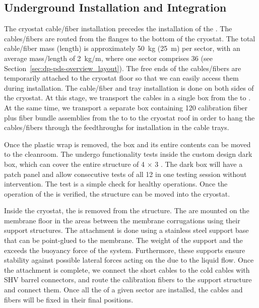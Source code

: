 \subsection{Underground Installation and Integration}
\label{subsec:dp-pds-undergroundinstallation}

The cryostat cable/fiber installation precedes the installation of the . The cables/fibers are routed from the flanges to the bottom of the cryostat. The total cable/fiber mass (length) is approximately \SI{50}{\kg} (\SI{25}{\m}) per sector, with an average mass/length of \SI{2}{\kg/\m}, where one sector comprises \num{36}  (see Section~\ref{sec:dp-pds-overview_layout}). The free ends of the cables/fibers are temporarily attached to the cryostat floor so that we can easily access them during installation. The cable/fiber and tray installation is done on both sides of the cryostat. At this stage, we transport the  cables %
in a single box from the  to . At the same time, we transport a separate box containing \num{120} calibration fiber plus fiber bundle assemblies %
 from the  to %
 to the cryostat roof in order to hang the cables/fibers %
 through the feedthroughs for installation in the cable trays.  

Once the plastic wrap is removed, the   box and its entire contents can be moved to the cleanroom. The  undergo functionality tests inside the custom design dark box, which can cover the entire structure of \num{4} $\times$ \num{3} . The dark box will have a  patch panel and allow consecutive tests of all \num{12}  in one testing session without intervention. The test is a simple check for healthy  operations. Once the operation of the  is verified, the structure can be moved into the cryostat.

Inside the cryostat, the  is removed from the structure. %
The  are mounted on the membrane floor in the areas between the membrane corrugations using their support structures. The attachment is done using a stainless steel support base that can be point-glued to the membrane. The weight of the support and the  exceeds the buoyancy force of the system. Furthermore, these supports %
ensure stability against possible lateral forces acting on the  due to the liquid flow. Once the attachment is complete, we connect the short  cables to the cold  cables with SHV barrel connectors, and route the calibration fibers  to the support structure  and connect them. Once all the  of a given  sector are installed, the cables and fibers will be fixed in their final positions.

